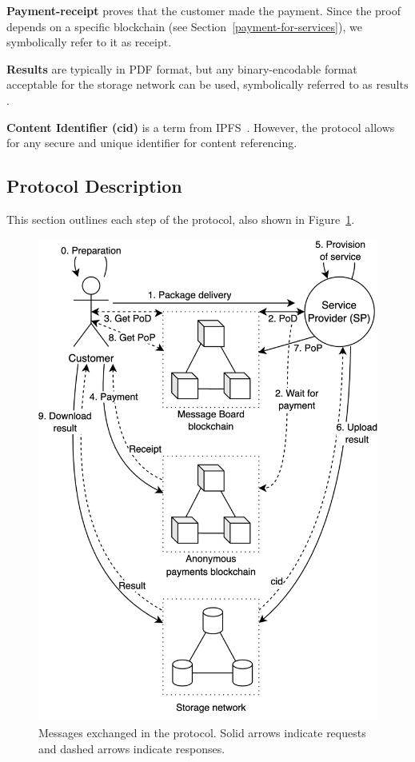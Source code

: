 \documentclass[pdftex,twocolumn,epjc3]{svjour3}
\begin{document}
\noindent \textbf
{Payment-receipt}\label{payment-receipt} proves that the customer made the payment. Since the proof depends on a specific blockchain (see Section~\ref{payment-for-services}), we symbolically refer to it as $\mathrm{receipt}$.

\begin{sloppypar}
\noindent \textbf{Results}\label{results} are typically in PDF format, but any binary-encodable format acceptable for the storage network can be used, symbolically referred to as $\mathrm{results}$.
\end{sloppypar}

\noindent \textbf{Content Identifier (cid)}\label{content-identifier-cid} is a term from IPFS~\cite{ipfsContentIdentifiersCIDs}. However, the protocol allows for any secure and unique identifier for content referencing.

\subsection{Protocol Description}\label{protocol-description}

This section outlines each step of the protocol, also shown in Figure~\ref{fig:protocol-diagram}.

\begin{figure}[ht!]
\includegraphics[width=\linewidth]{anonser-protocol.png}
\centering
\caption{Messages exchanged in the protocol. Solid arrows indicate requests and dashed arrows indicate responses.}
\label{fig:protocol-diagram}
\end{figure}
\end{document}
